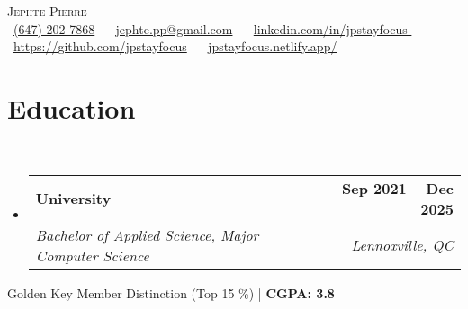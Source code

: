\documentclass[letterpaper,11pt]{article}
\makeatletter
\newcommand{\resumeSubheading}[4]{
  \vspace{-2pt}\item
    \begin{tabular*}{1.0\textwidth}[t]{l@{\extracolsep{\fill}}r}
      \textbf{#1} & \textbf{\small #2} \\
      \textit{\small#3} & \textit{\small #4} \\
    \end{tabular*}\vspace{-7pt}
}
\newcommand{\resumeSubHeadingListStart}{\begin{itemize}[leftmargin=0.0in, label={}]}
\newcommand{\resumeSubHeadingListEnd}{\end{itemize}\vspace{0pt}}
\makeatother
\begin{document}
\begin{center}
    {\Large \scshape Jephte Pierre} \\[2mm]
    \footnotesize \raisebox{-0.1\height}
    \faPhone\ \underline{(647) 202-7868} ~ 
    {\faEnvelope\  \underline{jephte.pp@gmail.com}} ~ 
    {\faLinkedin\ \underline{linkedin.com/in/jpstayfocus }}  ~
    {\faGithub\ \underline{https://github.com/jpstayfocus}} ~
    {\faBriefcase\ \underline{jpstayfocus.netlify.app/}}
    \vspace{-8pt}
\end{center}

\section{Education} \\[2mm]

  \resumeSubHeadingListStart
    \resumeSubheading
      {University}{Sep 2021 -- Dec 2025}
      {Bachelor of Applied Science, Major Computer Science
      }{Lennoxville, QC}
  \resumeSubHeadingListEnd
    {Golden Key Member Distinction (Top 15 \%) | \textbf{CGPA: 3.8}}
    \vspace{-5pt}

\end{document}
